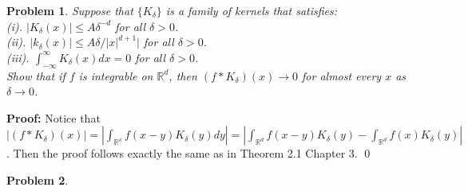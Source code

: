\documentclass[12pt]{article}
\newtheorem{problem}{Problem}
\begin{document}
\begin{problem}
Suppose that $\{K_{\delta}\}$ is a family of kernels that satisfies: \\

(i). $|K_{\delta}(x)|\leq A\delta^{-d}$ for all $\delta > 0$. \\
\indent (ii). $|k_{\delta}(x)|\leq A\delta/|x|^{d+1}|$ for all $\delta > 0$. \\ 
\indent (iii). $\int_{-\infty}^{\infty}K_{\delta}(x)dx = 0$ for all $\delta > 0$. \\

Show that if $f$ is integrable on $\mathbb{R}^{d}$, then $(f\ast K_{\delta})(x) \to 0$ for almost every $x$ as $\delta\to 0$.
\end{problem}

\textbf{Proof:} Notice that $\left | (f \ast K_{\delta})(x) \right | = \left | \int_{\mathbb{R^{d}}} f(x-y)K_{\delta}(y)dy \right | = \left | \int_{\mathbb{R}^{d}}f(x-y)K_{\delta}(y) - \int_{\mathbb{R}^{d}}f(x)K_{\delta}(y)\right |$. Then the proof follows exactly the same as in Theorem 2.1 Chapter 3. \qed

\begin{problem}
    
\end{problem}
\end{document}

